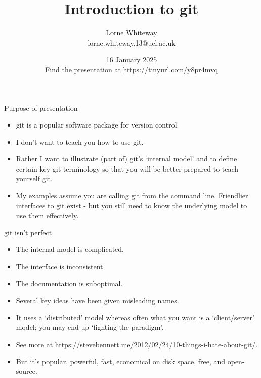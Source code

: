 \documentclass[usenames,dvipsnames]{beamer}
\title{Introduction to git}
\author{Lorne Whiteway \\ lorne.whiteway.13@ucl.ac.uk}
\institute{Astrophysics Group \\ Department of Physics and Astronomy \\ University College London}
\date{16 January 2025 \\ Find the presentation at \alert{\url{https://tinyurl.com/y8pr4mvq}}}
\begin{document}
\frame{\titlepage}

\begin{frame}{Purpose of presentation}
  \begin{block}{}
    \begin{itemize}
      \item{git is a popular software package for version control.}
      \item{I don't want to teach you how to use git.}
      \item{Rather I want to illustrate (part of) git's `internal model' and to define certain key git terminology so that you will be better prepared to teach yourself git.}
      \item{My examples assume you are calling git from the command line. Friendlier interfaces to git exist - but you still need to know the underlying model to use them effectively.}
    \end{itemize}
  \end{block}
\end{frame}


\begin{frame}{git isn't perfect}
  \begin{block}{}
    \begin{itemize}
      \item{The internal model is complicated.}
      \item{The interface is inconsistent.}
      \item{The documentation is suboptimal.}
      \item{Several key ideas have been given misleading names.}
      \item{It uses a `distributed' model whereas often what you want is a `client/server' model; you may end up `fighting the paradigm'.}
      \item{See more at \url{https://stevebennett.me/2012/02/24/10-things-i-hate-about-git/}.}
      \item{But it's popular, powerful, fast, economical on disk space, free, and open-source.}
    \end{itemize}
  \end{block}
\end{frame}
\end{document}
